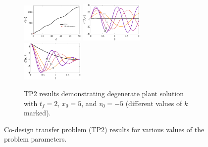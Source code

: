 \begin{figure}
\begin{subfigure}[b]{1\textwidth}
  \centering
  \includegraphics[width=0.333\textwidth]{../ch3/figures/T1_3_PSI}%
  \includegraphics[width=0.333\textwidth]{../ch3/figures/T1_3_U}%
  \includegraphics[width=0.333\textwidth]{../ch3/figures/T1_3_X}%
  \caption{TP2 results demonstrating degenerate plant solution with $t_f = 2$, $x_0 = 5$, and $v_0 = -5$ (different values of $k$ marked).\label{fig:ch3:T1_3}}
\end{subfigure}%

\caption[Co-design transfer problem (TP2) results]{Co-design transfer problem (TP2) results for various values of the problem parameters.\label{fig:ch3:T1}}
\end{figure}%